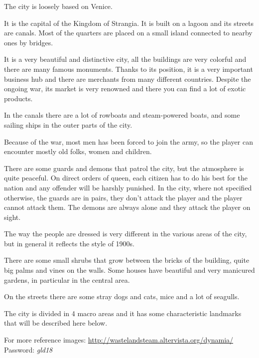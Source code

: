 The city is loosely based on Venice.

It is the capital of the Kingdom of Strangia. It is built on a lagoon and its streets are canals. Most of the quarters are placed on a small island connected to nearby ones by bridges.

It is a very beautiful and distinctive city, all the buildings are very colorful and there are many famous monuments. Thanks to its position, it is a very important business hub and there are merchants from many different countries. Despite the ongoing war, its market is very renowned and there you can find a lot of exotic products.

In the canals there are a lot of rowboats and steam-powered boats, and some sailing ships in the outer parts of the city.

Because of the war, most men has been forced to join the army, so the player can encounter mostly old folks, women and children.

There are some guards and demons that patrol the city, but the atmosphere is quite peaceful. On direct orders of queen, each citizen has to do his best for the nation and any offender will be harshly punished. In the city, where not specified otherwise, the guards are in pairs, they don't attack the player and the player cannot attack them. The demons are always alone and they attack the player on sight.

The way the people are dressed is very different in the various areas of the city, but in general it reflects the style of 1900s.

There are some small shrubs that grow between the bricks of the building, quite big palms and vines on the walls. Some houses have beautiful and very manicured gardens, in particular in the central area.

On the streets there are some stray dogs and cats, mice and a lot of seagulls.

The city is divided in 4 macro areas and it has some characteristic landmarks that will be described here below.

For more reference images: \url{http://wastelandsteam.altervista.org/dynamia/}\\
Password: \textit{gld18}
